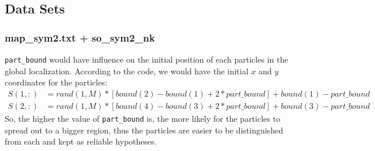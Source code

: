\documentclass[11pt,a4paper]{article}
\begin{document}
\subsection{Data Sets}
\subsubsection{map\_sym2.txt + so\_sym2\_nk}
\par \texttt{part\_bound} would have influence on the initial position of each particles in the global localization. According to the code, we would have the initial $x$ and $y$ coordinates for the particles:
	\begin{align}
		S(1,:) &= rand(1,M) * [ bound(2) - bound(1) + 2 * part\_bound ] + bound(1) - part\_bound \\
		S(2,:) &= rand(1,M) * [ bound(4) - bound(3) + 2 * part\_bound ] + bound(3) - part\_bound
	\end{align}
So, the higher the value of \texttt{part\_bound} is, the more likely for the particles to spread out to a bigger region, thus the particles are easier to be distinguished from each and kept as reliable hypotheses.
\end{document}
